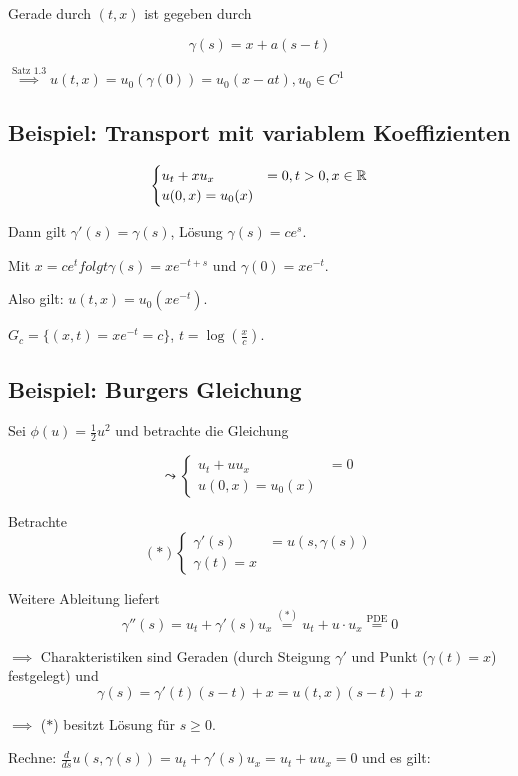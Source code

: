 Gerade durch $(t,x)$ ist gegeben durch

$$
\gamma(s) = x + a(s-t)
$$

$\overset{\text{Satz 1.3}}{\implies} u(t,x) = u_0(\gamma(0)) = u_0(x-at), u_0 \in C^1$

\subsection{Beispiel: Transport mit variablem Koeffizienten}

$$
\begin{cases}
  u_t + x u_x &= 0, t > 0, x \in \mathbb{R} \\
  u(0,x) = u_0(x)
\end{cases}
$$

Dann gilt $\gamma'(s) = \gamma(s)$, Lösung $\gamma(s) = c e^s$.

Mit $x = ce^t folgt \gamma(s) = x e^{-t+s}$ und $\gamma(0) = xe^{-t}$.

Also gilt: $u(t,x) = u_0(x e^{-t})$.

$G_c = \{ (x,t) = xe^{-t} = c\}$, $t = \log(\frac{x}{c})$.

\subsection{Beispiel: Burgers Gleichung}

Sei $\phi(u) = \frac{1}{2}u^2$ und betrachte die Gleichung

$$
\leadsto
\begin{cases}
  u_t + u u_x &= 0 \\
  u(0,x) = u_0(x)
\end{cases}
$$

Betrachte
$$
(\ast) 
\begin{cases}
  \gamma'(s) &= u(s, \gamma(s)) \\
  \gamma(t) = x
\end{cases}
$$

Weitere Ableitung liefert
$$
\gamma''(s) = u_t + \gamma'(s) u_x \overset{(\ast)}{=} u_t + u \cdot u_x \overset{\text{PDE}}{=} 0
$$

$\implies$ Charakteristiken sind Geraden (durch Steigung $\gamma'$ und Punkt ($\gamma(t) = x$) festgelegt) und
$$
\gamma(s) = \gamma'(t)(s-t) + x
= u(t, x)(s-t) + x
$$

$\implies$ ($\ast$) besitzt Lösung für $s \geq 0$.

Rechne: $\frac{d}{ds} u(s, \gamma(s)) = u_t + \gamma'(s) u_x = u_t + u u_x = 0$ und es gilt:

